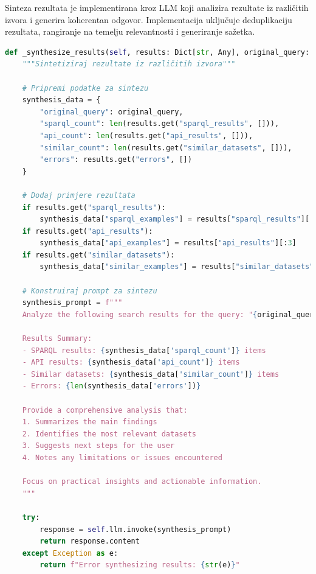 Sinteza rezultata je implementirana kroz LLM koji analizira rezultate iz različitih izvora i generira koherentan odgovor. Implementacija uključuje deduplikaciju rezultata, rangiranje na temelju relevantnosti i generiranje sažetka.

\begin{lstlisting}[language=Python, caption=Implementacija sinteze rezultata]
def _synthesize_results(self, results: Dict[str, Any], original_query: str) -> str:
    """Sintetiziraj rezultate iz različitih izvora"""
    
    # Pripremi podatke za sintezu
    synthesis_data = {
        "original_query": original_query,
        "sparql_count": len(results.get("sparql_results", [])),
        "api_count": len(results.get("api_results", [])),
        "similar_count": len(results.get("similar_datasets", [])),
        "errors": results.get("errors", [])
    }
    
    # Dodaj primjere rezultata
    if results.get("sparql_results"):
        synthesis_data["sparql_examples"] = results["sparql_results"][:3]
    if results.get("api_results"):
        synthesis_data["api_examples"] = results["api_results"][:3]
    if results.get("similar_datasets"):
        synthesis_data["similar_examples"] = results["similar_datasets"][:3]
    
    # Konstruiraj prompt za sintezu
    synthesis_prompt = f"""
    Analyze the following search results for the query: "{original_query}"
    
    Results Summary:
    - SPARQL results: {synthesis_data['sparql_count']} items
    - API results: {synthesis_data['api_count']} items  
    - Similar datasets: {synthesis_data['similar_count']} items
    - Errors: {len(synthesis_data['errors'])}
    
    Provide a comprehensive analysis that:
    1. Summarizes the main findings
    2. Identifies the most relevant datasets
    3. Suggests next steps for the user
    4. Notes any limitations or issues encountered
    
    Focus on practical insights and actionable information.
    """
    
    try:
        response = self.llm.invoke(synthesis_prompt)
        return response.content
    except Exception as e:
        return f"Error synthesizing results: {str(e)}"
\end{lstlisting}

